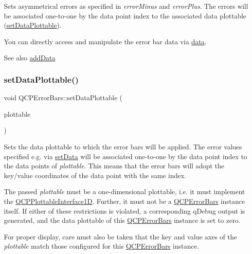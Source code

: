 Sets asymmetrical errors as specified in {\itshape error\+Minus} and {\itshape error\+Plus}. The errors will be associated one-\/to-\/one by the data point index to the associated data plottable (\hyperlink{classQCPErrorBars_aabb42a964cfbf780cd1c79850c7cd989}{set\+Data\+Plottable}).

You can directly access and manipulate the error bar data via \hyperlink{classQCPErrorBars_aeebd1b14f4c3573565efafd514988813}{data}.

\begin{DoxySeeAlso}{See also}
\hyperlink{classQCPErrorBars_aae296ad9817b3fa418db284af81cecf8}{add\+Data} 
\end{DoxySeeAlso}
\mbox{\label{classQCPErrorBars_aabb42a964cfbf780cd1c79850c7cd989}} 
\subsubsection{\texorpdfstring{set\+Data\+Plottable()}{setDataPlottable()}}
{\footnotesize\ttfamily void Q\+C\+P\+Error\+Bars\+::set\+Data\+Plottable (\begin{DoxyParamCaption}\item[{\hyperlink{classQCPAbstractPlottable}{Q\+C\+P\+Abstract\+Plottable} $\ast$}]{plottable }\end{DoxyParamCaption})}

Sets the data plottable to which the error bars will be applied. The error values specified e.\+g. via \hyperlink{classQCPErrorBars_a92b1980003255f5f7c05407a4d92aabc}{set\+Data} will be associated one-\/to-\/one by the data point index to the data points of {\itshape plottable}. This means that the error bars will adopt the key/value coordinates of the data point with the same index.

The passed {\itshape plottable} must be a one-\/dimensional plottable, i.\+e. it must implement the \hyperlink{classQCPPlottableInterface1D}{Q\+C\+P\+Plottable\+Interface1D}. Further, it must not be a \hyperlink{classQCPErrorBars}{Q\+C\+P\+Error\+Bars} instance itself. If either of these restrictions is violated, a corresponding q\+Debug output is generated, and the data plottable of this \hyperlink{classQCPErrorBars}{Q\+C\+P\+Error\+Bars} instance is set to zero.

For proper display, care must also be taken that the key and value axes of the {\itshape plottable} match those configured for this \hyperlink{classQCPErrorBars}{Q\+C\+P\+Error\+Bars} instance. \mbox{\label{classQCPErrorBars_af0af493d454a8f3a0908830160680d2b}} 

